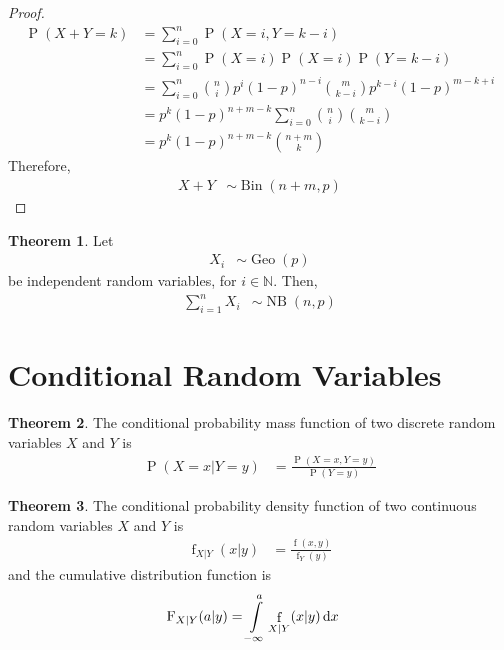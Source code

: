 \documentclass[titlepage, fleqn, a4paper, 12pt, twoside]{article}
\theoremstyle{definition}
\theoremstyle{theorem}
\newtheorem{theorem}{Theorem}
\DeclareMathOperator{\prob}{\mathrm{P}}
\DeclareMathOperator{\pdf}{\mathrm{f}}
\DeclareMathOperator{\bin}{\mathrm{Bin}}
\DeclareMathOperator{\geo}{\mathrm{Geo}}
\DeclareMathOperator{\nb}{\mathrm{NB}}
\newcommand*{\cdf}[1]{\mathrm{F}_{#1}}
\begin{document}
\begin{proof}
	\begin{align*}
		\prob(X + Y = k) & = \sum\limits_{i = 0}^{n} \prob(X = i , Y = k - i)                                                        \\
                                 & = \sum\limits_{i = 0}^{n} \prob(X = i) \prob(X = i) \prob(Y = k - i)                                      \\
                                 & = \sum\limits_{i = 0}^{n} \binom{n}{i} p^i (1 - p)^{n - i} \binom{m}{k - i} p^{k - i} (1 - p)^{m - k + i} \\
                                 & = p^k (1 - p)^{n + m - k} \sum\limits_{i = 0}^{n} \binom{n}{i} \binom{m}{k - i}                           \\
                                 & = p^k (1 - p)^{n + m - k} \binom{n + m}{k}
	\end{align*}
	Therefore,
	\begin{align*}
		X + Y & \sim \bin(n + m , p)
	\end{align*}
\end{proof}

\begin{theorem}
	Let
	\begin{align*}
		X_i & \sim \geo(p)
	\end{align*}
	be independent random variables, for $i \in \mathbb{N}$.
	Then,
	\begin{align*}
		\sum\limits_{i = 1}^{n} X_i & \sim \nb(n,p)
	\end{align*}
\end{theorem}

\section{Conditional Random Variables}

\begin{theorem}
	The conditional probability mass function of two discrete random variables $X$ and $Y$ is
	\begin{align*}
		\prob(X = x | Y = y) & = \frac{\prob(X = x , Y = y)}{\prob(Y = y)}
	\end{align*}
\end{theorem}

\begin{theorem}
	The conditional probability density function of two continuous random variables $X$ and $Y$ is
	\begin{align*}
		\pdf_{X|Y}(x|y) & = \frac{\pdf(x,y)}{\pdf_Y(y)}
	\end{align*}
	and the cumulative distribution function is
	\begin{align*}
		\cdf{X|Y}(a|y) & = \int\limits_{-\infty}^{a} \pdf_{X|Y}(x|y) \dif x
	\end{align*}
\end{theorem}
\end{document}
